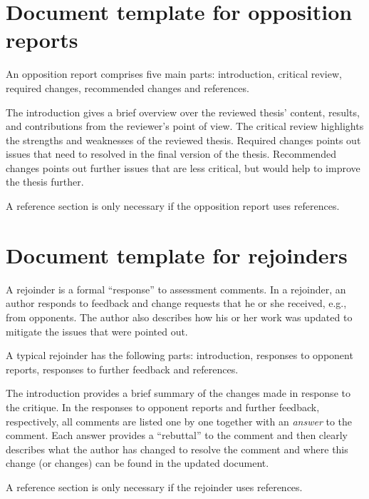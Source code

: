 \documentclass[a4paper,12pt]{book}
\begin{document}
\section{Document template for opposition reports}
An opposition report comprises five main parts: introduction, critical review,
required changes, recommended changes and references.

The introduction gives a brief overview over the reviewed thesis'
content, results, and contributions from the reviewer's point of view.
The critical review highlights the strengths and weaknesses of the
reviewed thesis. Required changes points out issues that need to
resolved in the final version of the thesis. Recommended changes
points out further issues that are less critical, but would help to improve
the thesis further.

A reference section is only necessary if the opposition report
uses references.


\section{Document template for rejoinders}
A rejoinder is a formal ``response'' to assessment comments. In a rejoinder,
an author responds to feedback and change requests that he or she received,
e.g., from opponents.
The author also describes how his or her work was updated to mitigate the
issues that were pointed out.

A typical rejoinder has the following parts: introduction, responses to opponent
reports, responses to further feedback and references.

The introduction provides a brief summary of the changes made in response to
the critique. In the responses to opponent reports and further feedback,
respectively, all comments are listed one by one together with an \textit{answer}
to the comment. Each answer provides a ``rebuttal'' to the comment and then
clearly describes what the author has changed to resolve the
comment and where this change (or changes) can be found in the updated
document.

A reference section is only necessary if the rejoinder uses references.


%
\backmatter
%
\nocite{*}


%
\end{document}
